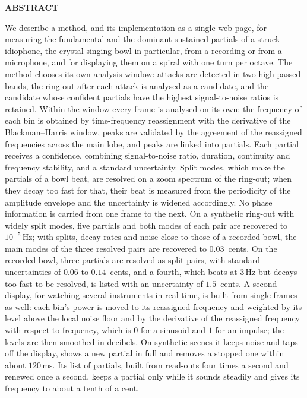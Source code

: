 \documentclass[10pt,a4paper,twocolumn]{article}
\newcommand{\Hz}{\,\mathrm{Hz}}
\newcommand{\ms}{\,\mathrm{ms}}
\begin{document}
\begin{center}\bfseries ABSTRACT\end{center}
\vspace{-4pt}
\noindent
We describe a method, and its implementation as a single web page, for measuring the fundamental and the dominant sustained partials of a struck idiophone, the crystal singing bowl in particular, from a recording or from a microphone, and for displaying them on a spiral with one turn per octave. The method chooses its own analysis window: attacks are detected in two high-passed bands, the ring-out after each attack is analysed as a candidate, and the candidate whose confident partials have the highest signal-to-noise ratios is retained. Within the window every frame is analysed on its own: the frequency of each bin is obtained by time-frequency reassignment with the derivative of the Blackman--Harris window, peaks are validated by the agreement of the reassigned frequencies across the main lobe, and peaks are linked into partials. Each partial receives a confidence, combining signal-to-noise ratio, duration, continuity and frequency stability, and a standard uncertainty. Split modes, which make the partials of a bowl beat, are resolved on a zoom spectrum of the ring-out; when they decay too fast for that, their beat is measured from the periodicity of the amplitude envelope and the uncertainty is widened accordingly. No phase information is carried from one frame to the next. On a synthetic ring-out with widely split modes, five partials and both modes of each pair are recovered to $10^{-5}\Hz$; with splits, decay rates and noise close to those of a recorded bowl, the main modes of the three resolved pairs are recovered to $0.03$~cents. On the recorded bowl, three partials are resolved as split pairs, with standard uncertainties of $0.06$ to $0.14$~cents, and a fourth, which beats at $3\Hz$ but decays too fast to be resolved, is listed with an uncertainty of $1.5$~cents. A second display, for watching several instruments in real time, is built from single frames as well: each bin's power is moved to its reassigned frequency and weighted by its level above the local noise floor and by the derivative of the reassigned frequency with respect to frequency, which is $0$ for a sinusoid and $1$ for an impulse; the levels are then smoothed in decibels. On synthetic scenes it keeps noise and taps off the display, shows a new partial in full and removes a stopped one within about $120\ms$. Its list of partials, built from read-outs four times a second and renewed once a second, keeps a partial only while it sounds steadily and gives its frequency to about a tenth of a cent.
\end{document}

